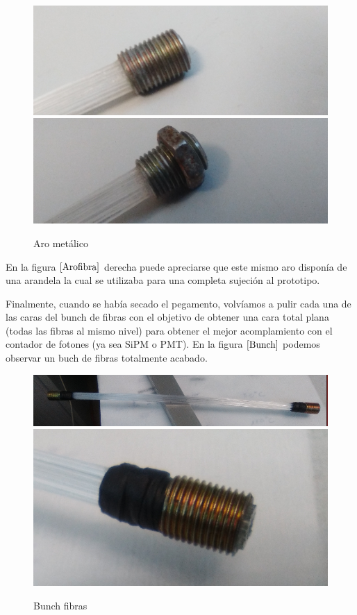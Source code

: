 \begin{figure}[htb]
\centering
{
\includegraphics[scale=0.3]{arometalico.png} 
}
{
\includegraphics[scale=0.3]{arometalicoconrosca.png} 
}
\caption{Aro metálico\label{Arofibra}}
\end{figure} 

En la figura $\ref{Arofibra}$ derecha puede apreciarse que este mismo aro disponía de una arandela la cual se utilizaba para una completa sujeción al prototipo.

Finalmente, cuando se había secado el pegamento, volvíamos a pulir cada una de las caras del bunch de fibras con el objetivo de obtener una cara total plana (todas las fibras al mismo nivel) para obtener el mejor acomplamiento con el contador de fotones (ya sea SiPM o PMT). En la figura $\ref{Bunch}$ podemos observar un buch de fibras totalmente acabado.

\begin{figure}[htb]
\centering
{
\includegraphics[scale=0.3]{bunchfibras.png} 
}
{
\includegraphics[scale=0.3]{bunchfibras1.png} 
}
\caption{Bunch fibras\label{Bunch}}
\end{figure} 

